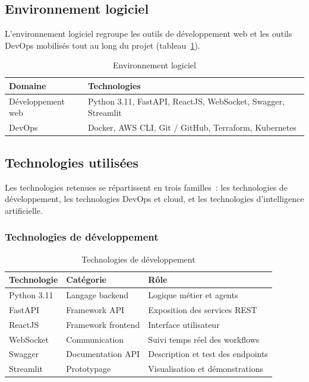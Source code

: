 \subsection{Environnement logiciel}

L'environnement logiciel regroupe les outils de développement web et les outils DevOps
mobilisés tout au long du projet (tableau~\ref{tab:env-logiciel}).

\begin{table}[H]
    \centering
    \caption{Environnement logiciel}
    \label{tab:env-logiciel}
    \begin{tabularx}{\textwidth}{@{}>{\raggedright\arraybackslash}p{4cm} >{\raggedright\arraybackslash}X@{}}
        \hline
        \textbf{Domaine} & \textbf{Technologies} \\
        \hline
        Développement web & Python 3.11, FastAPI, ReactJS, WebSocket, Swagger, Streamlit \\
        DevOps & Docker, AWS CLI, Git / GitHub, Terraform, Kubernetes \\
        \hline
    \end{tabularx}
\end{table}

\subsection{Technologies utilisées}

Les technologies retenues se répartissent en trois familles~: les technologies de
développement, les technologies DevOps et cloud, et les technologies d'intelligence
artificielle.

\subsubsection{Technologies de développement}

\begin{table}[H]
    \centering
    \caption{Technologies de développement}
    \label{tab:tech-dev}
    \begin{tabularx}{\textwidth}{@{}>{\raggedright\arraybackslash}p{3.2cm} >{\raggedright\arraybackslash}p{3.8cm} >{\raggedright\arraybackslash}X@{}}
        \hline
        \textbf{Technologie} & \textbf{Catégorie} & \textbf{Rôle} \\
        \hline
        Python 3.11 & Langage backend & Logique métier et agents \\
        FastAPI & Framework API & Exposition des services REST \\
        ReactJS & Framework frontend & Interface utilisateur \\
        WebSocket & Communication & Suivi temps réel des workflows \\
        Swagger & Documentation API & Description et test des endpoints \\
        Streamlit & Prototypage & Visualisation et démonstrations \\
        \hline
    \end{tabularx}
\end{table}

